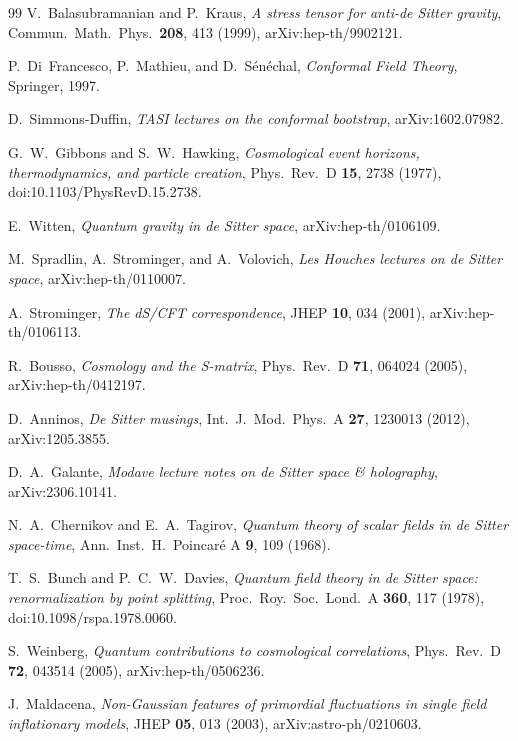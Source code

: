 \documentclass[
  aps,
  prd,
  preprint,
  groupedaddress,
  nofootinbib,
  longbibliography
]{revtex4-2}
\theoremstyle{remark}
\begin{document}
\begin{thebibliography}{99}
V.~Balasubramanian and P.~Kraus,
\textit{A stress tensor for anti-de Sitter gravity},
Commun.\ Math.\ Phys.\ \textbf{208}, 413 (1999),
arXiv:hep-th/9902121.

P.~Di~Francesco, P.~Mathieu, and D.~S\'en\'echal,
\textit{Conformal Field Theory},
Springer, 1997.

D.~Simmons-Duffin,
\textit{TASI lectures on the conformal bootstrap},
arXiv:1602.07982.

G.~W.~Gibbons and S.~W.~Hawking,
\textit{Cosmological event horizons, thermodynamics, and particle creation},
Phys.\ Rev.\ D \textbf{15}, 2738 (1977),
doi:10.1103/PhysRevD.15.2738.

E.~Witten,
\textit{Quantum gravity in de Sitter space},
arXiv:hep-th/0106109.

M.~Spradlin, A.~Strominger, and A.~Volovich,
\textit{Les Houches lectures on de Sitter space},
arXiv:hep-th/0110007.

A.~Strominger,
\textit{The dS/CFT correspondence},
JHEP \textbf{10}, 034 (2001),
arXiv:hep-th/0106113.

R.~Bousso,
\textit{Cosmology and the S-matrix},
Phys.\ Rev.\ D \textbf{71}, 064024 (2005),
arXiv:hep-th/0412197.

D.~Anninos,
\textit{De Sitter musings},
Int.\ J.\ Mod.\ Phys.\ A \textbf{27}, 1230013 (2012),
arXiv:1205.3855.

D.~A.~Galante,
\textit{Modave lecture notes on de Sitter space \& holography},
arXiv:2306.10141.

N.~A.~Chernikov and E.~A.~Tagirov,
\textit{Quantum theory of scalar fields in de Sitter space-time},
Ann.\ Inst.\ H.\ Poincar\'e A \textbf{9}, 109 (1968).

T.~S.~Bunch and P.~C.~W.~Davies,
\textit{Quantum field theory in de Sitter space: renormalization by point splitting},
Proc.\ Roy.\ Soc.\ Lond.\ A \textbf{360}, 117 (1978),
doi:10.1098/rspa.1978.0060.

S.~Weinberg,
\textit{Quantum contributions to cosmological correlations},
Phys.\ Rev.\ D \textbf{72}, 043514 (2005),
arXiv:hep-th/0506236.

J.~Maldacena,
\textit{Non-Gaussian features of primordial fluctuations in single field inflationary models},
JHEP \textbf{05}, 013 (2003),
arXiv:astro-ph/0210603.


\end{thebibliography}
\end{document}
